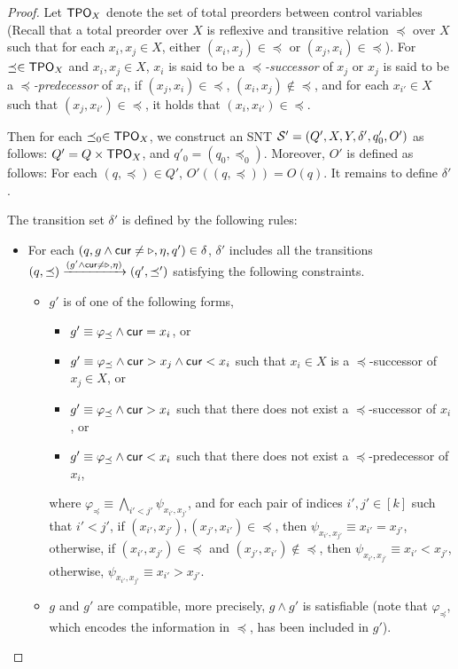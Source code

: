 \begin{appendix}
\begin{proof}
Let $\mathsf{TPO}_{X}$ denote the set of total preorders between control variables (Recall that a total preorder over $X$ is reflexive and transitive relation $\preceq$  over $X$ such that for each $x_i, x_j \in X$, either $(x_i, x_j) \in \preceq$ or $(x_j, x_i) \in \preceq$). For $\preceq \in \mathsf{TPO}_X$ and $x_i, x_j \in X$,  $x_i$ is said to be a \emph{$\preceq$-successor} of  $x_j$ or $x_j$ is said to be a \emph{$\preceq$-predecessor} of $x_i$, if $(x_j, x_i) \in \preceq$, $(x_i, x_j) \not \in \preceq$, and for each $x_{i'} \in X$ such that $(x_j, x_{i'}) \in \preceq$, it holds that $(x_i, x_{i'}) \in \preceq$. 

Then for each $\preceq_0 \in \mathsf{TPO}_X$, we construct an SNT ${\mathcal{S} }'= (Q', X, Y, \delta', q'_0, O')$ as follows: $Q'= Q \times \mathsf{TPO}_X$, and $q'_0=(q_0,  \preceq_0)$. Moreover, $O'$ is defined as follows: For each $(q, \preceq) \in Q'$, $O'((q, \preceq)) = O(q)$. It remains to define $\delta'$.

The transition set $\delta'$ is defined by the following rules:
\begin{itemize}
\item For each $(q, g \wedge \mathsf{cur} \neq \triangleright, \eta, q') \in \delta$, $\delta'$ includes all the transitions $(q, \preceq) \xrightarrow{(g' \wedge \mathsf{cur} \neq \triangleright, \eta)} (q', \preceq')$ satisfying the following constraints. 
\begin{itemize}
\item  $g'$ is of one of the following forms, 
\begin{itemize}
\item $g' \equiv \varphi_{\preceq} \wedge \mathsf{cur} = x_i$, or
\item $g' \equiv \varphi_{\preceq} \wedge \mathsf{cur} > x_j \wedge \mathsf{cur} < x_i$ such that $x_i \in X$ is a $\preceq$-successor of $x_j \in X$, or
\item $g' \equiv \varphi_{\preceq} \wedge \mathsf{cur} > x_i$ such that there does not exist a $\preceq$-successor of $x_i$, or
\item $g' \equiv \varphi_{\preceq} \wedge \mathsf{cur} < x_i$ such that there does not exist a $\preceq$-predecessor of $x_i$,
\end{itemize}
where $\varphi_{\preceq} \equiv \bigwedge \limits_{ i' < j'} \psi_{x_{i'}, x_{j'}}$, and for each pair of indices $i', j' \in [k]$ such that $i' < j'$,  if $(x_{i'}, x_{j'}), (x_{j'}, x_{i'}) \in \preceq$, then $\psi_{x_{i'}, x_{j'}} \equiv x_{i'} = x_{j'}$, otherwise, if $(x_{i'}, x_{j'}) \in \preceq$ and $(x_{j'}, x_{i'}) \not \in \preceq$, then $\psi_{x_{i'}, x_{j'}} \equiv x_{i'} < x_{j'}$, otherwise, $\psi_{x_{i'}, x_{j'}} \equiv x_{i'} > x_{j'}$.
%
\item $g$ and $g'$ are compatible, more precisely, $g \wedge g'$ is satisfiable (note that $\varphi_{\preceq}$, which encodes the information in $\preceq$, has been included in $g'$). 


\end{itemize}
\end{itemize}
\end{proof}
\end{appendix}

